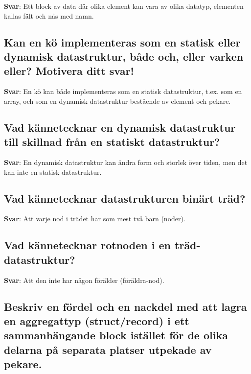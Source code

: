 \documentclass[a4paper,11pt,oneside]{article}
\begin{document}
\begin{sloppypar}
\label{q:267:sa:sv:True}

\textbf{Svar}: Ett block av data d\"ar olika element kan vara av olika datatyp, elementen kallas f\"alt och n\r{a}s med namn.



\subsection{Kan en k\"o implementeras som en statisk eller dynamisk datastruktur, b\r{a}de och, eller varken eller? Motivera ditt svar!}

\label{q:268:sa:sv:True}

\textbf{Svar}: En k\"o kan b\r{a}de implementeras som en statisk datastruktur, t.ex. som en array, och som en dynamisk datastruktur best\r{a}ende av element och pekare.



\subsection{Vad k\"annetecknar en dynamisk datastruktur till skillnad fr\r{a}n en statiskt datastruktur?}

\label{q:269:sa:sv:True}

\textbf{Svar}: En dynamisk datastruktur kan \"andra form och storlek \"over tiden, men det kan inte en statisk datastruktur.



\subsection{Vad k\"annetecknar datastrukturen bin\"art tr\"ad?}

\label{q:270:sa:sv:True}

\textbf{Svar}: Att varje nod i tr\"adet har som mest tv\r{a} barn (noder).



\subsection{Vad k\"annetecknar rotnoden i en tr\"ad-datastruktur?}

\label{q:271:sa:sv:True}

\textbf{Svar}: Att den inte har n\r{a}gon f\"or\"alder (f\"or\"aldra-nod).



\subsection{Beskriv en f\"ordel och en nackdel med att lagra en aggregattyp (struct/record) i ett sammanh\"angande block ist\"allet f\"or de olika delarna p\r{a} separata platser utpekade av pekare.}


\end{sloppypar}
\end{document}
